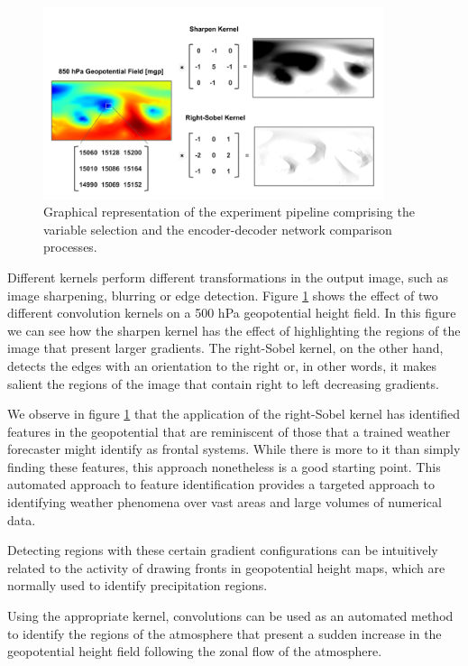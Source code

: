\documentclass[twocol]{ametsoc}
\begin{document}
\begin{figure}[h]
 \centerline{\includegraphics[width=10cm]{convolution_op.png}}
  \caption{Graphical representation of the experiment pipeline comprising the variable selection and the encoder-decoder network comparison processes.}\label{convolution_op}
\end{figure}

Different kernels perform different transformations in the output image, such as image sharpening, blurring or edge detection. Figure \ref{convolution_op} shows the effect of two different convolution kernels on a 500 hPa geopotential height field. In this figure we can see how the sharpen kernel has the effect of highlighting the regions of the image that present larger gradients. The right-Sobel kernel, on the other hand, detects the edges with an orientation to the right or, in other words, it makes salient the regions of the image that contain right to left decreasing gradients. 

We observe in figure \ref{convolution_op} that the application of the right-Sobel kernel has identified features in the geopotential that are reminiscent of those that a trained weather forecaster might identify as frontal systems. While there is more to it than simply finding these features, this approach nonetheless is a good starting point. This automated approach to feature identification provides a targeted approach to identifying weather phenomena over vast areas and large volumes of numerical data.

Detecting regions with these certain gradient configurations can be intuitively related to the activity of drawing fronts in geopotential height maps, which are normally used to identify precipitation regions. 

Using the appropriate kernel, convolutions can be used as an automated method to identify the regions of the atmosphere that present a sudden increase in the geopotential height field following the zonal flow of the atmosphere.
\end{document}

